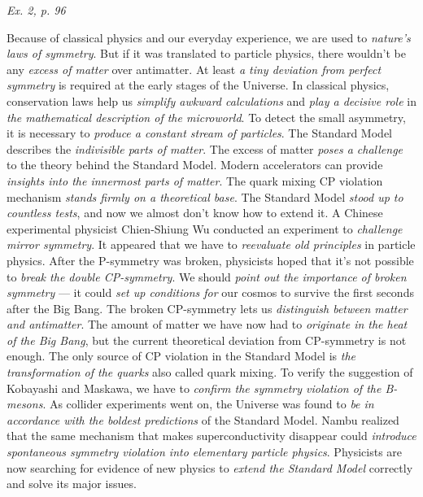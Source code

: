\documentclass[a4paper, 12pt]{article}
\def\task#1{\begin{center}\it #1\end{center}}
\begin{document}
\task{Ex. 2, p. 96}
Because of classical physics and our everyday experience, we are used 
to \textit{nature's laws of symmetry}. But if it was translated to 
particle physics, there wouldn't be any \textit{excess of matter} over 
antimatter. At least \textit{a tiny deviation from perfect symmetry} is 
required at the early stages of the Universe. In classical physics, 
conservation laws help us \textit{simplify awkward calculations} and 
\textit{play a decisive role} in \textit{the mathematical description 
of the microworld}. To detect the small asymmetry, it is necessary to 
\textit{produce a constant stream of particles}. The Standard Model 
describes the \textit{indivisible parts of matter}. The excess of 
matter \textit{poses a challenge} to the theory behind the Standard 
Model. Modern accelerators can provide \textit{insights into the 
innermost parts of matter}. The quark mixing CP violation mechanism 
\textit{stands firmly on a theoretical base}. The Standard Model 
\textit{stood up to countless tests}, and now we almost don't know how 
to extend it. A Chinese experimental physicist Chien-Shiung Wu 
conducted an experiment to \textit{challenge mirror symmetry}. It 
appeared that we have to \textit{reevaluate old principles} in particle 
physics. After the P-symmetry was broken, physicists hoped that it's 
not possible to \textit{break the double CP-symmetry}. We should 
\textit{point out the importance of broken symmetry} --- it could 
\textit{set up conditions for} our cosmos to survive the first seconds 
after the Big Bang. The broken CP-symmetry lets us \textit{distinguish 
between matter and antimatter}. The amount of matter we have now had to 
\textit{originate in the heat of the Big Bang}, but the current 
theoretical deviation from CP-symmetry is not enough. The only source 
of CP violation in the Standard Model is \textit{the transformation of 
the quarks} also called quark mixing. To verify the suggestion of 
Kobayashi and Maskawa, we have to \textit{confirm the symmetry 
violation of the B-mesons}. As collider experiments went on, the 
Universe was found to \textit{be in accordance with the boldest 
predictions} of the Standard Model. Nambu realized that the same 
mechanism that makes superconductivity disappear could 
\textit{introduce spontaneous symmetry violation into elementary 
particle physics}. Physicists are now searching for evidence of new 
physics to \textit{extend the Standard Model} correctly and solve its 
major issues.
\end{document}
